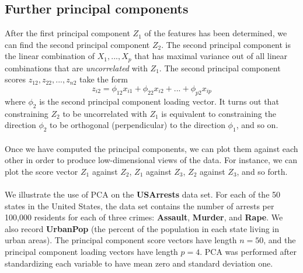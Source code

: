 \subsection{Further principal components}
After the first principal component $Z_1$ of the features has been determined, we can find the second principal component $Z_2$. The second principal component is the linear combination of $X_1,...,X_p$ that has maximal variance out of all linear combinations that are \textit{uncorrelated} with $Z_1$. The second principal component scores $z_{12}, z_{22},...,z_{n2}$ take the form
\[z_{i2} = \phi_{12} x_{i1} + \phi_{22}x_{i2} + ... + \phi_{p2} x_{ip}\]
where $\phi_2$ is the second principal component loading vector.  It turns out that constraining $Z_2$ to be uncorrelated with $Z_1$ is equivalent to constraining the direction $\phi_2$ to be orthogonal (perpendicular) to the direction $\phi_1$, and so on.\\\\
Once we have computed the principal components, we can plot them
against each other in order to produce low-dimensional views of the data. For instance, we can plot the score vector $Z_1$ against $Z_2$, $Z_1$ against $Z_3$,
$Z_2$ against $Z_3$, and so forth.\\\\
We illustrate the use of PCA on the \textbf{USArrests} data set. For each of the
50 states in the United States, the data set contains the number of arrests
per 100,000 residents for each of three crimes: \textbf{Assault}, \textbf{Murder}, and \textbf{Rape}. We also record \textbf{UrbanPop} (the percent of the population in each state living in urban areas). The principal component score vectors have length $n = 50$, and the principal component loading vectors have length $p = 4$. PCA was performed after standardizing each variable to have mean zero and standard deviation one.
